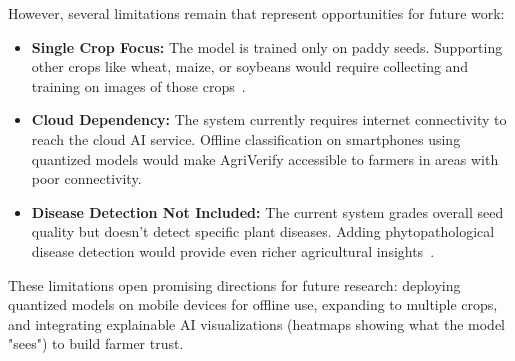 However, several limitations remain that represent opportunities for future work:

\begin{itemize}
    \item \textbf{Single Crop Focus:} The model is trained only on paddy seeds. Supporting other crops like wheat, maize, or soybeans would require collecting and training on images of those crops~\cite{xu2021}.
    
    \item \textbf{Cloud Dependency:} The system currently requires internet connectivity to reach the cloud AI service. Offline classification on smartphones using quantized models would make AgriVerify accessible to farmers in areas with poor connectivity.
    
    \item \textbf{Disease Detection Not Included:} The current system grades overall seed quality but doesn't detect specific plant diseases. Adding phytopathological disease detection would provide even richer agricultural insights~\cite{mohanty2016}.
\end{itemize}

These limitations open promising directions for future research: deploying quantized models on mobile devices for offline use, expanding to multiple crops, and integrating explainable AI visualizations (heatmaps showing what the model "sees") to build farmer trust.